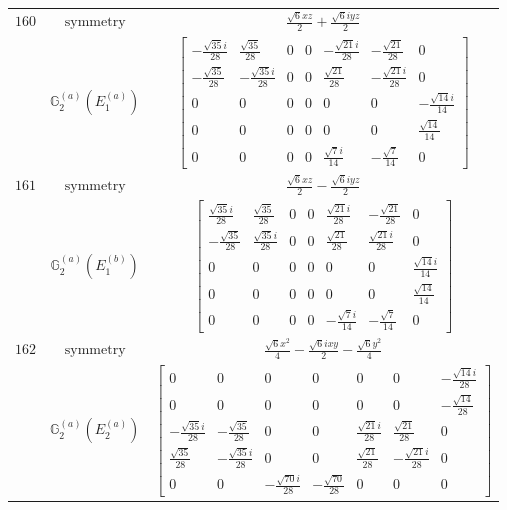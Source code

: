 \documentclass[fleqn,8pt,landscape]{jsarticle}
\begin{document}
\begin{longtable}{ccc}
$ 160 $ & $ \text{symmetry} $ & $ \frac{\sqrt{6} x z}{2} + \frac{\sqrt{6} i y z}{2} $ \\
$  $ & $ \mathbb{G}_{2}^{(a)}(E_{1}^{(a)}) $ & $ \begin{bmatrix} - \frac{\sqrt{35} i}{28} & \frac{\sqrt{35}}{28} & 0 & 0 & - \frac{\sqrt{21} i}{28} & - \frac{\sqrt{21}}{28} & 0 \\ - \frac{\sqrt{35}}{28} & - \frac{\sqrt{35} i}{28} & 0 & 0 & \frac{\sqrt{21}}{28} & - \frac{\sqrt{21} i}{28} & 0 \\ 0 & 0 & 0 & 0 & 0 & 0 & - \frac{\sqrt{14} i}{14} \\ 0 & 0 & 0 & 0 & 0 & 0 & \frac{\sqrt{14}}{14} \\ 0 & 0 & 0 & 0 & \frac{\sqrt{7} i}{14} & - \frac{\sqrt{7}}{14} & 0 \end{bmatrix} $ \\ \hline
$ 161 $ & $ \text{symmetry} $ & $ \frac{\sqrt{6} x z}{2} - \frac{\sqrt{6} i y z}{2} $ \\
$  $ & $ \mathbb{G}_{2}^{(a)}(E_{1}^{(b)}) $ & $ \begin{bmatrix} \frac{\sqrt{35} i}{28} & \frac{\sqrt{35}}{28} & 0 & 0 & \frac{\sqrt{21} i}{28} & - \frac{\sqrt{21}}{28} & 0 \\ - \frac{\sqrt{35}}{28} & \frac{\sqrt{35} i}{28} & 0 & 0 & \frac{\sqrt{21}}{28} & \frac{\sqrt{21} i}{28} & 0 \\ 0 & 0 & 0 & 0 & 0 & 0 & \frac{\sqrt{14} i}{14} \\ 0 & 0 & 0 & 0 & 0 & 0 & \frac{\sqrt{14}}{14} \\ 0 & 0 & 0 & 0 & - \frac{\sqrt{7} i}{14} & - \frac{\sqrt{7}}{14} & 0 \end{bmatrix} $ \\ \hline
$ 162 $ & $ \text{symmetry} $ & $ \frac{\sqrt{6} x^{2}}{4} - \frac{\sqrt{6} i x y}{2} - \frac{\sqrt{6} y^{2}}{4} $ \\
$  $ & $ \mathbb{G}_{2}^{(a)}(E_{2}^{(a)}) $ & $ \begin{bmatrix} 0 & 0 & 0 & 0 & 0 & 0 & - \frac{\sqrt{14} i}{28} \\ 0 & 0 & 0 & 0 & 0 & 0 & - \frac{\sqrt{14}}{28} \\ - \frac{\sqrt{35} i}{28} & - \frac{\sqrt{35}}{28} & 0 & 0 & \frac{\sqrt{21} i}{28} & \frac{\sqrt{21}}{28} & 0 \\ \frac{\sqrt{35}}{28} & - \frac{\sqrt{35} i}{28} & 0 & 0 & \frac{\sqrt{21}}{28} & - \frac{\sqrt{21} i}{28} & 0 \\ 0 & 0 & - \frac{\sqrt{70} i}{28} & - \frac{\sqrt{70}}{28} & 0 & 0 & 0 \end{bmatrix} $ \\ \hline

\end{longtable}
\end{document}
